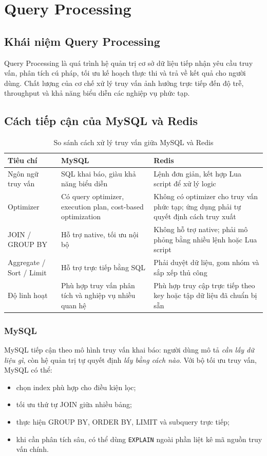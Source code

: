 \section{Query Processing}

\subsection{Khái niệm Query Processing}
Query Processing là quá trình hệ quản trị cơ sở dữ liệu tiếp nhận yêu cầu truy vấn, phân tích cú pháp, tối ưu kế hoạch thực thi và trả về kết quả cho người dùng. Chất lượng của cơ chế xử lý truy vấn ảnh hưởng trực tiếp đến độ trễ, throughput và khả năng biểu diễn các nghiệp vụ phức tạp.

\subsection{Cách tiếp cận của MySQL và Redis}
\begin{table}[H]
\centering
\caption{So sánh cách xử lý truy vấn giữa MySQL và Redis}
\label{tab:query-processing-overview}
\begin{tabular}{|p{3.2cm}|p{5.2cm}|p{5.2cm}|}
\hline
\textbf{Tiêu chí} & \textbf{MySQL} & \textbf{Redis} \\ \hline
Ngôn ngữ truy vấn & SQL khai báo, giàu khả năng biểu diễn & Lệnh đơn giản, kết hợp Lua script để xử lý logic \\ \hline
Optimizer & Có query optimizer, execution plan, cost-based optimization & Không có optimizer cho truy vấn phức tạp; ứng dụng phải tự quyết định cách truy xuất \\ \hline
JOIN / GROUP BY & Hỗ trợ native, tối ưu nội bộ & Không hỗ trợ native; phải mô phỏng bằng nhiều lệnh hoặc Lua script \\ \hline
Aggregate / Sort / Limit & Hỗ trợ trực tiếp bằng SQL & Phải duyệt dữ liệu, gom nhóm và sắp xếp thủ công \\ \hline
Độ linh hoạt & Phù hợp truy vấn phân tích và nghiệp vụ nhiều quan hệ & Phù hợp truy cập trực tiếp theo key hoặc tập dữ liệu đã chuẩn bị sẵn \\ \hline
\end{tabular}
\end{table}

\subsubsection{MySQL}
MySQL tiếp cận theo mô hình truy vấn khai báo: người dùng mô tả \textit{cần lấy dữ liệu gì}, còn hệ quản trị tự quyết định \textit{lấy bằng cách nào}. Với bộ tối ưu truy vấn, MySQL có thể:
\begin{itemize}
    \item chọn index phù hợp cho điều kiện lọc;
    \item tối ưu thứ tự JOIN giữa nhiều bảng;
    \item thực hiện GROUP BY, ORDER BY, LIMIT và subquery trực tiếp;
    \item khi cần phân tích sâu, có thể dùng \texttt{EXPLAIN} ngoài phần liệt kê mã nguồn truy vấn chính.
\end{itemize}

